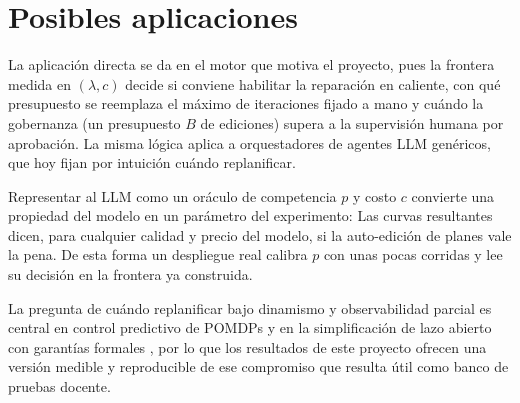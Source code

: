 \section{Posibles aplicaciones}

\begin{description}[leftmargin=1.4em]

\item[Diseño de motores de ejecución agéntica.] La aplicación directa se da en el motor que
motiva el proyecto, pues la frontera medida en $(\lambda, c)$ decide si conviene habilitar
la reparación en caliente, con qué presupuesto se reemplaza el máximo de iteraciones fijado
a mano y cuándo la gobernanza (un presupuesto $B$ de ediciones) supera a
la supervisión humana por aprobación. La misma lógica aplica a orquestadores de agentes LLM
genéricos, que hoy fijan por intuición cuándo replanificar.

\item[Presupuestos de deliberación con LLM.] Representar al LLM como un oráculo de
competencia $p$ y costo $c$ convierte una propiedad del modelo en un parámetro del
experimento: Las curvas resultantes dicen, para cualquier calidad y precio del modelo, si
la auto-edición de planes vale la pena. De esta forma un despliegue real calibra $p$ con
unas pocas corridas y lee su decisión en la frontera ya construida.

\item[Replanificación en robótica y control.] La pregunta de cuándo replanificar bajo
dinamismo y observabilidad parcial es central en control predictivo de POMDPs
\parencite{ma2018performance} y en la simplificación de lazo abierto con garantías
formales \parencite{kong2026open}, por lo que los resultados de este proyecto ofrecen una
versión medible y reproducible de ese compromiso que resulta útil como banco de pruebas
docente.


\end{description}

